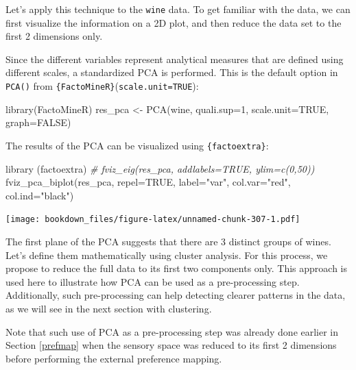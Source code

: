 \documentclass[
]{krantz}
\makeatletter
\newenvironment{Shaded}{\begin{snugshade}}{\end{snugshade}}
\newcommand{\AttributeTok}[1]{\textcolor[rgb]{0.61,0.61,0.61}{#1}}
\newcommand{\CommentTok}[1]{\textcolor[rgb]{0.37,0.37,0.37}{\textit{#1}}}
\newcommand{\ConstantTok}[1]{\textcolor[rgb]{0,0,0}{#1}}
\newcommand{\DecValTok}[1]{\textcolor[rgb]{0.06,0.06,0.06}{#1}}
\newcommand{\FunctionTok}[1]{\textcolor[rgb]{0,0,0}{#1}}
\newcommand{\NormalTok}[1]{#1}
\newcommand{\OtherTok}[1]{\textcolor[rgb]{0.37,0.37,0.37}{#1}}
\newcommand{\StringTok}[1]{\textcolor[rgb]{0.5,0.5,0.5}{#1}}
\renewenvironment{quote}{\begin{VF}}{\end{VF}}
\newenvironment{kframe}{%
\medskip{}
\setlength{\fboxsep}{.8em}
 \def\at@end@of@kframe{}%
 \ifinner\ifhmode%
  \def\at@end@of@kframe{\end{minipage}}%
  \begin{minipage}{\columnwidth}%
 \fi\fi%
 \def\FrameCommand##1{\hskip\@totalleftmargin \hskip-\fboxsep
 \colorbox{shadecolor}{##1}\hskip-\fboxsep
     \hskip-\linewidth \hskip-\@totalleftmargin \hskip\columnwidth}%
 \MakeFramed {\advance\hsize-\width
   \@totalleftmargin\z@ \linewidth\hsize
   \@setminipage}}%
 {\par\unskip\endMakeFramed%
 \at@end@of@kframe}
\renewenvironment{Shaded}{\begin{kframe}}{\end{kframe}}
\makeatother
\begin{document}
Let's apply this technique to the \texttt{wine} data. To get familiar with the data, we can first visualize the information on a 2D plot, and then reduce the data set to the first 2 dimensions only.

Since the different variables represent analytical measures that are defined using different scales, a standardized PCA is performed. This is the default option in \texttt{PCA()} from \texttt{\{FactoMineR\}}(\texttt{scale.unit=TRUE}):

\begin{Shaded}
\begin{Highlighting}[]
\FunctionTok{library}\NormalTok{(FactoMineR)}
\NormalTok{res\_pca }\OtherTok{\textless{}{-}} \FunctionTok{PCA}\NormalTok{(wine, }\AttributeTok{quali.sup=}\DecValTok{1}\NormalTok{, }\AttributeTok{scale.unit=}\ConstantTok{TRUE}\NormalTok{, }\AttributeTok{graph=}\ConstantTok{FALSE}\NormalTok{)}
\end{Highlighting}
\end{Shaded}

The results of the PCA can be visualized using \texttt{\{factoextra\}}:

\begin{Shaded}
\begin{Highlighting}[]
\FunctionTok{library}\NormalTok{ (factoextra)}
\CommentTok{\# fviz\_eig(res\_pca, addlabels=TRUE, ylim=c(0,50))}
\FunctionTok{fviz\_pca\_biplot}\NormalTok{(res\_pca, }\AttributeTok{repel=}\ConstantTok{TRUE}\NormalTok{, }\AttributeTok{label=}\StringTok{"var"}\NormalTok{, }
                \AttributeTok{col.var=}\StringTok{"red"}\NormalTok{, }\AttributeTok{col.ind=}\StringTok{"black"}\NormalTok{)}
\end{Highlighting}
\end{Shaded}

\texttt{[image: bookdown\_files/figure-latex/unnamed-chunk-307-1.pdf]}

The first plane of the PCA suggests that there are 3 distinct groups of wines. Let's define them mathematically using cluster analysis. For this process, we propose to reduce the full data to its first two components only. This approach is used here to illustrate how PCA can be used as a pre-processing step. Additionally, such pre-processing can help detecting clearer patterns in the data, as we will see in the next section with clustering.

\begin{quote}
Note that such use of PCA as a pre-processing step was already done earlier in Section \ref{prefmap} when the sensory space was reduced to its first 2 dimensions before performing the external preference mapping.
\end{quote}
\end{document}
